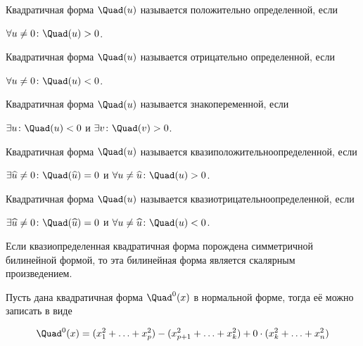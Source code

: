 
\begin{definition}
  Квадратичная форма \(\Quad(u)\) называется положительно определенной, если

  \(\forall u \neq 0 \colon \Quad(u) > 0\).
\end{definition}

\begin{definition}
  Квадратичная форма \(\Quad(u)\) называется отрицательно определенной, если

  \(\forall u \neq 0 \colon \Quad(u) < 0\).
\end{definition}

\begin{definition}
  Квадратичная форма \(\Quad(u)\) называется знакопеременной, если 

  \(\exists u \colon \Quad(u) < 0\) и \(\exists v \colon \Quad(v) > 0\).
\end{definition}

\begin{definition}
  Квадратичная форма \(\Quad(u)\) называется квазиположительноопределенной, если 

  \(\exists \widehat{u} \neq 0 \colon \Quad(\widehat{u}) = 0\) и
  \(\forall u \neq \widehat{u} \colon \Quad(u) > 0\).
\end{definition}

\begin{definition}
  Квадратичная форма \(\Quad(u)\) называется квазиотрицательноопределенной, если 

  \(\exists \widehat{u} \neq 0 \colon \Quad(\widehat{u}) = 0\) и
  \(\forall u \neq \widehat{u} \colon \Quad(u) < 0\).
\end{definition}

\begin{remark}
  Если квазиопределенная квадратичная форма порождена симметричной билинейной
  формой, то эта билинейная форма является скалярным произведением.
\end{remark}

Пусть дана квадратичная форма \(\Quad^{0}(x)\) в нормальной форме, тогда её
можно записать в виде

\begin{align*}
  \Quad^{0}(x)
  = (x_{1}^2 + \dotsc + x_{p}^2)
  - (x_{p + 1}^2 + \dotsc + x_{k}^2)
  + 0 \cdot (x_{k}^2 + \dotsc + x_{n}^2)
\end{align*}

